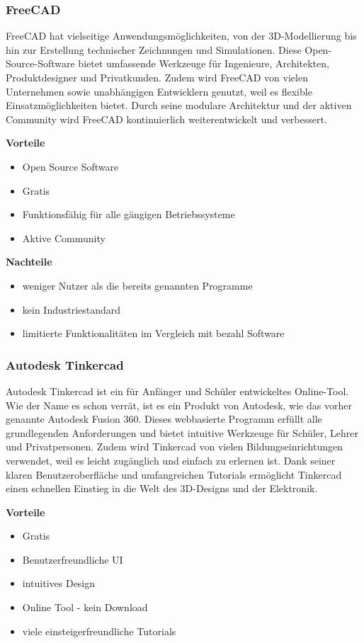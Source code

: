 \subsubsection{FreeCAD}
FreeCAD hat vielseitige Anwendungsmöglichkeiten, von der 3D-Modellierung bis hin zur Erstellung technischer Zeichnungen und Simulationen. Diese Open-Source-Software bietet umfassende Werkzeuge für Ingenieure, Architekten, Produktdesigner und Privatkunden. Zudem wird FreeCAD von vielen Unternehmen sowie unabhängigen Entwicklern genutzt, weil es flexible Einsatzmöglichkeiten bietet. Durch seine modulare Architektur und der aktiven Community wird FreeCAD kontinuierlich weiterentwickelt und verbessert. \cite{FreeCAD} 

\textbf{Vorteile}
\begin{itemize}
	\item Open Source Software
	\item Gratis
	\item Funktionsfähig für alle gängigen Betriebssysteme
	\item Aktive Community	 
\end{itemize}

\textbf{Nachteile}
\begin{itemize}
	\item weniger Nutzer als die bereits genannten Programme
	\item kein Industriestandard
	\item 	limitierte Funktionalitäten im Vergleich mit bezahl Software \cite{FreeCADReviews}
\end{itemize}

\subsubsection{Autodesk Tinkercad}
Autodesk Tinkercad ist ein für Anfänger und Schüler entwickeltes Online-Tool. Wie der Name es schon verrät, ist es ein Produkt von Autodesk, wie das vorher genannte Autodesk Fusion 360. Dieses webbasierte Programm erfüllt alle grundlegenden Anforderungen und bietet intuitive Werkzeuge für Schüler, Lehrer und Privatpersonen. Zudem wird Tinkercad von vielen Bildungseinrichtungen verwendet, weil es leicht zugänglich und einfach zu erlernen ist. Dank seiner klaren Benutzeroberfläche und umfangreichen Tutorials ermöglicht Tinkercad einen schnellen Einstieg in die Welt des 3D-Designs und der Elektronik. \cite{Tinkercad}

\textbf{Vorteile}
\begin{itemize}
	\item Gratis
	\item Benutzerfreundliche UI
	\item intuitives Design
	\item Online Tool - kein Download 	
	\item viele einsteigerfreundliche Tutorials 
\end{itemize}

